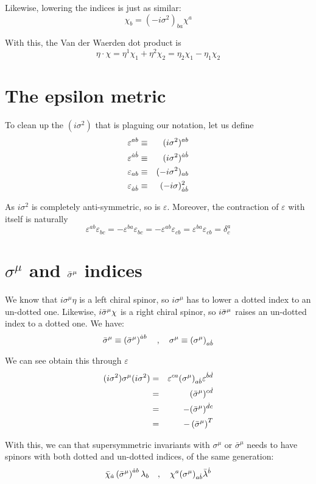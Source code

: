 Likewise, lowering the indices is just as similar:
\begin{equation}
    \chi_b = (-i\sigma^2)_{ba}\chi^a
    \label{eqn:3:lowering operation}
\end{equation}

With this, the Van der Waerden dot product is
\begin{equation}
    \eta \cdot \chi = \eta^1 \chi_1 + \eta^2 \chi_2 = \eta_2\chi_1 - \eta_1\chi_2
\end{equation}

\section{The epsilon metric}
\label{ch:3:the epsilon metric}
To clean up the $(i\sigma^2)$ that is plaguing our notation, let us define
\begin{eqnarray}
    \varepsilon^{ab} &\equiv& (i\sigma^2)^{ab} \nonumber \\
    \varepsilon^{\dot{a}\dot{b}} &\equiv& (i\sigma^2)^{\dot{a}\dot{b}} \nonumber \\
    \varepsilon_{ab} &\equiv& (-i\sigma^2)_{ab} \nonumber \\
    \varepsilon_{\dot{a}\dot{b}} &\equiv& (-i\sigma)^2_{\dot{a}\dot{b}} 
\end{eqnarray}

As $i\sigma^2$ is completely anti-symmetric, so is $\varepsilon$. Moreover, the contraction of $\varepsilon$ with itself is naturally
\begin{equation}
    \varepsilon^{ab}\varepsilon_{bc} = -\varepsilon^{ba}\varepsilon_{bc} = - \varepsilon^{ab}\varepsilon_{cb} = \varepsilon^{ba}\varepsilon_{cb} = \delta^a_c
\end{equation}

\section{$\sigma^\mu$ and $\Bar{\sigma}^\mu$ indices}
\label{ch:3:sigma indices}
We know that $i\sigma^\mu \eta$ is a left chiral spinor, so $i \sigma^\mu$ has to lower a dotted index to an un-dotted one. Likewise, $i\Bar{\sigma}^\mu \chi$ is a right chiral spinor, so $i \Bar{\sigma}^\mu$ raises an un-dotted index to a dotted one. We have:
\begin{equation}
    \Bar{\sigma}^\mu \equiv \left(\Bar{\sigma}^\mu\right)^{\dot{a}b} \quad , \quad \sigma^\mu \equiv \left(\sigma^\mu\right)_{a\dot{b}}
\end{equation}

We can see obtain this through $\varepsilon$
\begin{eqnarray}
    (i \sigma^2) \sigma^\mu (i \sigma^2) &=& \varepsilon^{ca}(\sigma^\mu)_{a\dot{b}}\varepsilon^{\dot{b}\dot{d}} \nonumber \\
    &=& (\Bar{\sigma}^\mu)^{c\dot{d}} \nonumber \\
    &=& - (\bar{\sigma}^\mu)^{\dot{d}c} \nonumber \\
    &=& - \left(\bar{\sigma}^\mu\right)^T
\end{eqnarray}

With this, we can that supersymmetric invariants with $\sigma^\mu$ or $\bar{\sigma}^\mu$ needs to have spinors with both dotted and un-dotted indices, of the same generation:
\begin{equation}
    \bar{\chi}_{\dot{a}} \left(\Bar{\sigma}^\mu\right)^{\dot{a}b} \lambda_b \quad , \quad \chi^a (\sigma^\mu)_{a\dot{b}} \bar{\lambda}^{\dot{b}}
\end{equation}